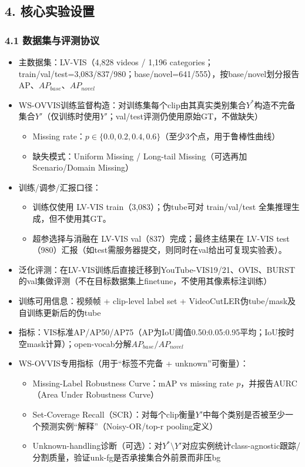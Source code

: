 \documentclass[UTF8]{ctexart}
\begin{document}
\par\noindent\hrulefill\par


\subsection*{4. 核心实验设置}

\subsubsection*{4.1 数据集与评测协议}
\begin{itemize}
\item 主数据集：LV-VIS（4,828 videos / 1,196 categories；train/val/test=3,083/837/980；base/novel=641/555），按base/novel划分报告AP、$AP_{base}$、$AP_{novel}$
\item WS-OVVIS训练监督构造：对训练集每个clip由其真实类别集合$Y^*$构造不完备集合$Y'$（仅训练时使用$Y'$；val/test评测仍使用原始GT，不做缺失）
\begin{itemize}
\item Missing rate：$p \in \{0.0, 0.2, 0.4, 0.6\}$（至少3个点，用于鲁棒性曲线）
\item 缺失模式：Uniform Missing / Long-tail Missing（可选再加Scenario/Domain Missing）
\end{itemize}
\item 训练/调参/汇报口径：
\begin{itemize}
\item 训练仅使用 LV-VIS train（3,083）；伪tube可对 train/val/test 全集推理生成，但不使用其GT。
\item 超参选择与消融在 LV-VIS val（837）完成；最终主结果在 LV-VIS test（980）汇报（如test需服务器提交，则同时在val给出可复现实验表）。
\end{itemize}
\item 泛化评测：在LV-VIS训练后直接迁移到YouTube-VIS19/21、OVIS、BURST的val集做评测（不在目标数据集上finetune，不使用其像素标注训练）
\item 训练可用信息：视频帧 + clip-level label set + VideoCutLER伪tube/mask及自训练更新后的伪tube
\item 指标：VIS标准AP/AP50/AP75（AP为IoU阈值0.50:0.05:0.95平均；IoU按时空mask计算）；open-vocab分解$AP_{base}/AP_{novel}$
\item WS-OVVIS专用指标（用于“标签不完备 + unknown”可衡量）：
\begin{itemize}
\item Missing-Label Robustness Curve：mAP vs missing rate $p$，并报告AURC（Area Under Robustness Curve）
\item Set-Coverage Recall（SCR）：对每个clip衡量$Y'$中每个类别是否被至少一个预测实例“解释”（Noisy-OR/top-r pooling定义）
\item Unknown-handling诊断（可选）：对$Y^*\setminus Y'$对应实例统计class-agnostic跟踪/分割质量，验证unk-fg是否承接集合外前景而非压bg
\end{itemize}
\end{itemize}
\end{document}
